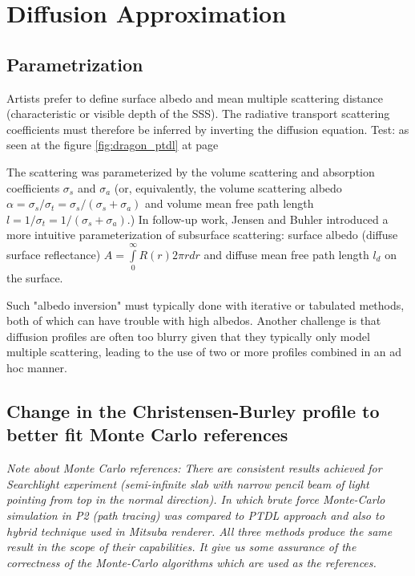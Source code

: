 \chapter{Diffusion Approximation}
\label{chapter:da}

\section{Parametrization}
Artists prefer to define surface albedo and mean multiple scattering distance
(characteristic or visible depth of the SSS). The radiative transport scattering
coefficients must therefore be inferred by inverting the diffusion equation.
Test: as seen at the figure \ref{fig:dragon_ptdl} at page \pageref{fig:dragon_ptdl}

The scattering was parameterized by the volume scattering and absorption
coefficients $\sigma_s$ and $\sigma_a$ (or, equivalently, the volume
scattering albedo $\alpha = \sigma_s/\sigma_t = \sigma_s/(\sigma_s + \sigma_a)$
and volume mean free path length $l = 1/\sigma_t = 1/(\sigma_s + \sigma_a)$.)
In follow-up work, Jensen and Buhler \cite{Jensen:2002:RHR:566570.566619}
introduced a more intuitive parameterization of subsurface scattering:
surface albedo (diffuse surface reflectance) $A = \int\limits_0^\infty
R(r)2\pi r dr$ and diffuse mean free path length $l_d$ on the surface.

Such "albedo inversion" must typically done with iterative or tabulated methods,
both of which can have trouble with high albedos. Another challenge is that
diffusion profiles are often too blurry given that they typically only model
multiple scattering, leading to the use of two or more profiles combined in an
ad hoc manner.




\section{Change in the Christensen-Burley profile to better fit Monte
Carlo references}


\textit{Note about Monte Carlo references:
There are consistent results achieved for Searchlight experiment
(semi-infinite slab with narrow pencil beam of light pointing from top in the normal
direction). In which brute force Monte-Carlo simulation in P2 (path tracing) was
compared to PTDL approach and also to hybrid technique used in Mitsuba
renderer. All three methods produce the same result in the scope of their
capabilities. It give us some assurance of the correctness of the Monte-Carlo
algorithms which are used as the references.}


